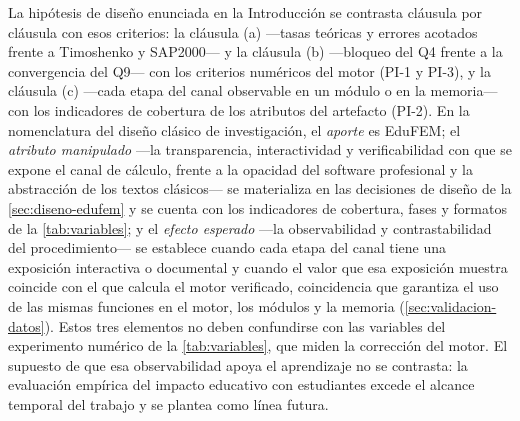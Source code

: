 La hipótesis de diseño enunciada en la Introducción se contrasta cláusula por cláusula con esos criterios: la cláusula (a) —tasas teóricas y errores acotados frente a Timoshenko y SAP2000— y la cláusula (b) —bloqueo del Q4 frente a la convergencia del Q9— con los criterios numéricos del motor (PI-1 y PI-3), y la cláusula (c) —cada etapa del canal observable en un módulo o en la memoria— con los indicadores de cobertura de los atributos del artefacto (PI-2). En la nomenclatura del diseño clásico de investigación, el \emph{aporte} es EduFEM; el \emph{atributo manipulado} —la transparencia, interactividad y verificabilidad con que se expone el canal de cálculo, frente a la opacidad del software profesional y la abstracción de los textos clásicos— se materializa en las decisiones de diseño de la \autoref{sec:diseno-edufem} y se cuenta con los indicadores de cobertura, fases y formatos de la \autoref{tab:variables}; y el \emph{efecto esperado} —la observabilidad y contrastabilidad del procedimiento— se establece cuando cada etapa del canal tiene una exposición interactiva o documental y cuando el valor que esa exposición muestra coincide con el que calcula el motor verificado, coincidencia que garantiza el uso de las mismas funciones en el motor, los módulos y la memoria (\autoref{sec:validacion-datos}). Estos tres elementos no deben confundirse con las variables del experimento numérico de la \autoref{tab:variables}, que miden la corrección del motor. El supuesto de que esa observabilidad apoya el aprendizaje no se contrasta: la evaluación empírica del impacto educativo con estudiantes excede el alcance temporal del trabajo y se plantea como línea futura.
